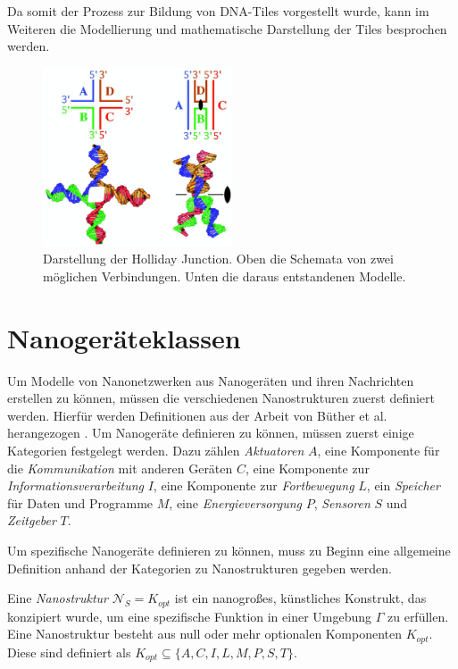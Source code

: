 Da somit der Prozess zur Bildung von DNA-Tiles vorgestellt wurde, kann im Weiteren die Modellierung und mathematische Darstellung der Tiles besprochen werden.

\begin{figure}
	\centering
	\includegraphics[width=0.5\textwidth]{images/Holliday_Junction.png}
	\caption[Holliday Junction]{Darstellung der Holliday Junction. Oben die Schemata von zwei möglichen Verbindungen. Unten die daraus entstandenen Modelle.\cite{brandt2000holliday}}
	\label{fig:holliday}
\end{figure}

\section{Nanogeräteklassen}
Um Modelle von Nanonetzwerken aus Nanogeräten und ihren Nachrichten erstellen zu können, müssen die verschiedenen Nanostrukturen zuerst definiert werden. Hierfür werden Definitionen aus der Arbeit von Büther et al. herangezogen \cite{buether2017formal}. Um Nanogeräte definieren zu können, müssen zuerst einige Kategorien festgelegt werden. 
Dazu zählen \emph{Aktuatoren} $A$, eine Komponente für die \emph{Kommunikation} mit anderen Geräten $C$, eine Komponente zur \emph{Informationsverarbeitung} $I$, eine Komponente zur \emph{Fortbewegung} $L$, ein \emph{Speicher} für Daten und Programme $M$\!, eine \emph{Energieversorgung} $P$\!, \emph{Sensoren} $S$ und \emph{Zeitgeber} $T$.

Um spezifische Nanogeräte definieren zu können, muss zu Beginn eine allgemeine Definition anhand der Kategorien zu Nanostrukturen gegeben werden. 

\begin{definition}
	Eine \emph{Nanostruktur} $\mathcal{N}_S = K_{opt}$ ist ein nanogroßes, künstliches Konstrukt, das konzipiert wurde, um eine spezifische Funktion in einer Umgebung $\Gamma$ zu erfüllen. Eine Nanostruktur besteht aus null oder mehr optionalen Komponenten $K_{opt}$. Diese sind definiert als $K_{opt} \subseteq \{A,C,I,L,M,P,S,T\}$.
\end{definition}

